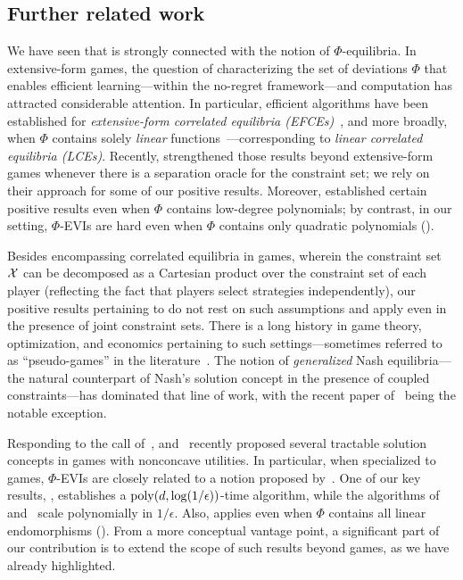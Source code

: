 \subsection{Further related work}
\label{sec:related}


We have seen that  is strongly connected with the notion of $\Phi$-equilibria. 
In extensive-form games, the question of characterizing the set of deviations $\Phi$ that enables efficient learning---within the no-regret framework---and computation has attracted considerable attention. In particular, efficient algorithms have been established for \emph{extensive-form correlated equilibria (EFCEs)}~\citep{Huang08:Computing,Farina22:Simple,Morrill21:Efficient,Morrill21:Hindsight}, and more broadly, when $\Phi$ contains solely \emph{linear} functions~\citep{Farina24:Polynomial,Farina23:Polynomial}---corresponding to \emph{linear correlated equilibria (LCEs)}. Recently, \citet{Daskalakis24:Efficient} strengthened those results beyond extensive-form games whenever there is a separation oracle for the constraint set; we rely on their approach for some of our positive results. Moreover, \citet{Zhang24:Efficient,Zhang25:Learning} established certain positive results even when $\Phi$ contains low-degree polynomials; by contrast, in our setting, $\Phi$-EVIs are hard even when $\Phi$ contains only quadratic polynomials ().

Besides encompassing correlated equilibria in games, wherein the constraint set ${\mathcal{X}}$ can be decomposed as a Cartesian product over the constraint set of each player (reflecting the fact that players select strategies independently), our positive results pertaining to  do not rest on such assumptions and apply even in the presence of joint constraint sets. There is a long history in game theory, optimization, and economics pertaining to such settings---sometimes referred to as ``pseudo-games'' in the literature~\citep{Goktas22:Exploitability,Arrow54:Existence,Facchinei10:Generalized,Fischer14:Generalized,Facchinei09:Generalized,Ardagna12:Generalized,Tatarenko18:Learning,Jordan23:First,Daskalakis21:Complexity}. The notion of \emph{generalized} Nash equilibria---the natural counterpart of Nash's solution concept in the presence of coupled constraints---has dominated that line of work, with the recent paper of~\citet{Bernasconi23:Constrained} being the notable exception.

Responding to the call of~\citet{Daskalakis22:Non}, \citet{Cai24:Tractable} and~\citet{Ahunbay25:First} recently proposed several tractable solution concepts in games with nonconcave utilities. In particular, when specialized to games, $\Phi$-EVIs are closely related to a notion proposed by~\citet[Definition 6]{Ahunbay25:First}. One of our key results, , establishes a $\mathrm{poly}(d, \log(1/\epsilon))$-time algorithm, while the algorithms of~\citet{Cai24:Accelerated} and~\citet{Ahunbay25:First} scale polynomially in $1/\epsilon$. Also,  applies even when $\Phi$ contains all linear endomorphisms (). From a more conceptual vantage point, a significant part of our contribution is to extend the scope of such results beyond games, as we have already highlighted.

